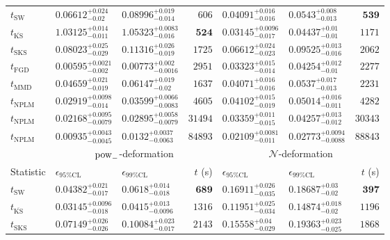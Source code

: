 \begin{tabular}{l|llr|llr}
	\midrule
	$t_{\mathrm{SW}}$ & $0.06612_{-0.02}^{+0.024}$ & $0.08996_{-0.014}^{+0.019}$ & $606$ & $0.04091_{-0.016}^{+0.016}$ & $0.0543_{-0.013}^{+0.008}$ & ${\mathbf{539}}$ \\
	$t_{\overline{\mathrm{KS}}}$ & $1.03125_{-0.011}^{+0.014}$ & $1.05323_{-0.016}^{+0.0083}$ & ${\mathbf{524}}$ & ${\mathbf{0.03145_{-0.017}^{+0.0096}}}$ & $0.04437_{-0.01}^{+0.01}$ & $1171$ \\
	$t_{\mathrm{SKS}}$ & $0.08023_{-0.029}^{+0.025}$ & $0.11316_{-0.019}^{+0.026}$ & $1725$ & $0.06612_{-0.023}^{+0.024}$ & $0.09525_{-0.016}^{+0.013}$ & $2062$ \\
	$t_{\mathrm{FGD}}$ & ${\mathbf{0.00595_{-0.002}^{+0.0021}}}$ & ${\mathbf{0.00773_{-0.0016}^{+0.002}}}$ & $2951$ & $0.03323_{-0.014}^{+0.015}$ & ${\mathbf{0.04254_{-0.01}^{+0.012}}}$ & $2277$ \\
	$t_{\mathrm{MMD}}$ & $0.04659_{-0.019}^{+0.021}$ & $0.06147_{-0.02}^{+0.019}$ & $1637$ & $0.04071_{-0.016}^{+0.016}$ & $0.0537_{-0.013}^{+0.017}$ & $2231$ \\
\rowcolor{red!35}	$t_{\mathrm{NPLM}}$ & $0.02919_{-0.014}^{+0.0098}$ & $0.03599_{-0.0083}^{+0.0066}$ & $4605$ & $0.04102_{-0.019}^{+0.015}$ & $0.05014_{-0.011}^{+0.016}$ & $4282$ \\
\rowcolor{blue!35}	$t_{\mathrm{NPLM}}$ & $0.02168_{-0.0079}^{+0.0095}$ & $0.02895_{-0.0079}^{+0.0058}$ & $31494$ & $0.03359_{-0.015}^{+0.011}$ & $0.04257_{-0.012}^{+0.013}$ & $30343$ \\
\rowcolor{green!35}	$t_{\mathrm{NPLM}}$ & $0.00935_{-0.0045}^{+0.0043}$ & $0.0132_{-0.0063}^{+0.0037}$ & $84893$ & $0.02109_{-0.011}^{+0.0081}$ & $0.02773_{-0.0088}^{+0.0094}$ & $88843$ \\
	\toprule
	\multicolumn{1}{c}{} & \multicolumn{3}{c}{$\rm{pow}_{-}$-deformation} & \multicolumn{3}{c}{$\mathcal{N}$-deformation} \\
Statistic & $\epsilon_{95\%\mathrm{CL}}$ & $\epsilon_{99\%\mathrm{CL}}$ & $t$ (s) & $\epsilon_{95\%\mathrm{CL}}$ & $\epsilon_{99\%\mathrm{CL}}$ & $t$ (s) \\
	\midrule
	$t_{\mathrm{SW}}$ & $0.04382_{-0.017}^{+0.021}$ & $0.0618_{-0.018}^{+0.014}$ & ${\mathbf{689}}$ & $0.16911_{-0.035}^{+0.026}$ & $0.18687_{-0.02}^{+0.03}$ & ${\mathbf{397}}$ \\
	$t_{\overline{\mathrm{KS}}}$ & ${\mathbf{0.03145_{-0.018}^{+0.0096}}}$ & ${\mathbf{0.0415_{-0.0096}^{+0.013}}}$ & $1316$ & $0.11951_{-0.034}^{+0.025}$ & $0.14874_{-0.02}^{+0.018}$ & $1196$ \\
	$t_{\mathrm{SKS}}$ & $0.07149_{-0.026}^{+0.026}$ & $0.10084_{-0.017}^{+0.023}$ & $2143$ & $0.15558_{-0.029}^{+0.04}$ & $0.19363_{-0.025}^{+0.023}$ & $1868$ \\

\end{tabular}
